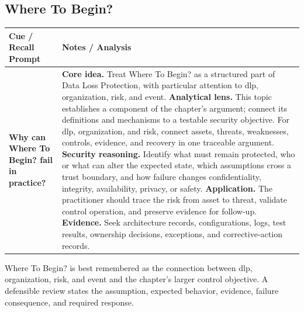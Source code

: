 \documentclass[11pt]{article}
\newcommand{\CornellHeader}{%
\rowcolor{Navy}\color{white}\bfseries Cue / Recall Prompt & \color{white}\bfseries Notes / Analysis\\\hline}
\newcommand{\CornellRow}[2]{%
\cellcolor{CueGray}\RaggedRight\textbf{#1} & \RaggedRight #2\\\hline}
\begin{document}
\subsection*{Where To Begin?}
\begin{longtable}{>{\RaggedRight\arraybackslash}p{}|>{\RaggedRight\arraybackslash}p{}}
\CornellHeader
\CornellRow{Why can Where To Begin? fail in practice?}{\textbf{Core idea.} Treat Where To Begin? as a structured part of Data Loss Protection, with particular attention to dlp, organization, risk, and event. \textbf{Analytical lens.} This topic establishes a component of the chapter's argument; connect its definitions and mechanisms to a testable security objective. For dlp, organization, and risk, connect assets, threats, weaknesses, controls, evidence, and recovery in one traceable argument. \textbf{Security reasoning.} Identify what must remain protected, who or what can alter the expected state, which assumptions cross a trust boundary, and how failure changes confidentiality, integrity, availability, privacy, or safety. \textbf{Application.} The practitioner should trace the risk from asset to threat, validate control operation, and preserve evidence for follow-up. \textbf{Evidence.} Seek architecture records, configurations, logs, test results, ownership decisions, exceptions, and corrective-action records.}
\end{longtable}
\begin{topicsummary}
Where To Begin? is best remembered as the connection between dlp, organization, risk, and event and the chapter's larger control objective. A defensible review states the assumption, expected behavior, evidence, failure consequence, and required response.
\end{topicsummary}
\end{document}
